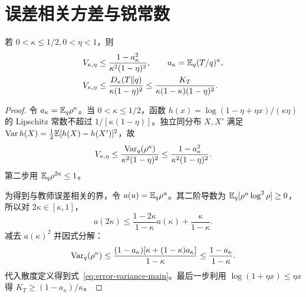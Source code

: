 \section{误差相关方差与锐常数}
\begin{theorem}[误差相关的监督方差上界]
若 $0<\kappa\le1/2,0<\eta<1$，则
\begin{align}
V_{\kappa,\eta}&\le\frac{1-a_\kappa^2}{\kappa^2(1-\eta)^2},\qquad a_\kappa=\mathbb E_q(T/q)^\kappa,\\
V_{\kappa,\eta}&\le\frac{D_\kappa(T\Vert q)}{\kappa(1-\eta)^2}
\le\frac{K_T}{\kappa(1-\kappa)(1-\eta)^2}.
\end{align}
\end{theorem}
\begin{proof}
令 $a_\kappa=\mathbb E_q\rho^\kappa$。当 $0<\kappa\le1/2$，函数 $h(x)=\log(1-\eta+\eta x)/(\kappa\eta)$ 的 Lipschitz 常数不超过 $1/[\kappa(1-\eta)]$。独立同分布 $X,X'$ 满足 $\operatorname{Var} h(X)=\frac12\mathbb E[h(X)-h(X')]^2$，故
\begin{equation}
V_{\kappa,\eta}\le\frac{\operatorname{Var}_q(\rho^\kappa)}{\kappa^2(1-\eta)^2}
\le\frac{1-a_\kappa^2}{\kappa^2(1-\eta)^2}.
\end{equation}
第二步用 $\mathbb E_q\rho^{2\kappa}\le1$。

为得到与教师误差相关的界，令 $a(u)=\mathbb E_q\rho^u$。其二阶导数为 $\mathbb E_q[\rho^u\log^2\rho]\ge0$，所以对 $2\kappa\in[\kappa,1]$，
\begin{equation}
a(2\kappa)\le\frac{1-2\kappa}{1-\kappa}a(\kappa)+\frac{\kappa}{1-\kappa}.
\end{equation}
减去 $a(\kappa)^2$ 并因式分解：
\begin{equation}
\operatorname{Var}_q(\rho^\kappa)
\le\frac{(1-a_\kappa)[\kappa+(1-\kappa)a_\kappa]}{1-\kappa}
\le\frac{1-a_\kappa}{1-\kappa}.
\end{equation}
代入散度定义得到式~\eqref{eq:error-variance-main}。最后一步利用 $\log(1+\eta x)\le\eta x$ 得 $K_T\ge(1-a_\kappa)/\kappa$。
\end{proof}

